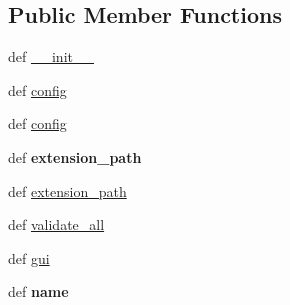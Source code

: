\subsection*{Public Member Functions}
\begin{DoxyCompactItemize}
\item 
def \hyperlink{classcommotion__client_1_1utils_1_1validate_1_1ClientConfig_a1cf31ea11ff5dc7f47fcd62f16ab81f8}{\+\_\+\+\_\+init\+\_\+\+\_\+}
\item 
def \hyperlink{classcommotion__client_1_1utils_1_1validate_1_1ClientConfig_ad835c01a4478e52d1d4042e7230b0c61}{config}
\item 
def \hyperlink{classcommotion__client_1_1utils_1_1validate_1_1ClientConfig_ad835c01a4478e52d1d4042e7230b0c61}{config}
\item 
\hypertarget{classcommotion__client_1_1utils_1_1validate_1_1ClientConfig_a7e66cdad22581943cee6dae41cd5b84f}{def {\bfseries extension\+\_\+path}}\label{classcommotion__client_1_1utils_1_1validate_1_1ClientConfig_a7e66cdad22581943cee6dae41cd5b84f}

\item 
def \hyperlink{classcommotion__client_1_1utils_1_1validate_1_1ClientConfig_a7e66cdad22581943cee6dae41cd5b84f}{extension\+\_\+path}
\item 
def \hyperlink{classcommotion__client_1_1utils_1_1validate_1_1ClientConfig_ae1cfca31202df7ad46ca996cf9b38b3d}{validate\+\_\+all}
\item 
def \hyperlink{classcommotion__client_1_1utils_1_1validate_1_1ClientConfig_aa3a463fc48d9d7d219356d6150b4630f}{gui}
\item 
\hypertarget{classcommotion__client_1_1utils_1_1validate_1_1ClientConfig_ab92a3ae4cc66c3141e643792d05cab3c}{def {\bfseries name}}\label{classcommotion__client_1_1utils_1_1validate_1_1ClientConfig_ab92a3ae4cc66c3141e643792d05cab3c}


\end{DoxyCompactItemize}
